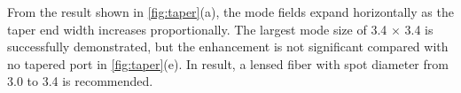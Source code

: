From the result shown in \autoref{fig:taper}(a), the mode fields expand horizontally as the taper end width increases proportionally. The largest mode size of 3.4 \um $\times$ 3.4 \um is successfully demonstrated, but the enhancement is not significant compared with no tapered port in \autoref{fig:taper}(e). In result, a lensed fiber with spot diameter from 3.0 \um  to 3.4 \um  is recommended. 

\bigskip


